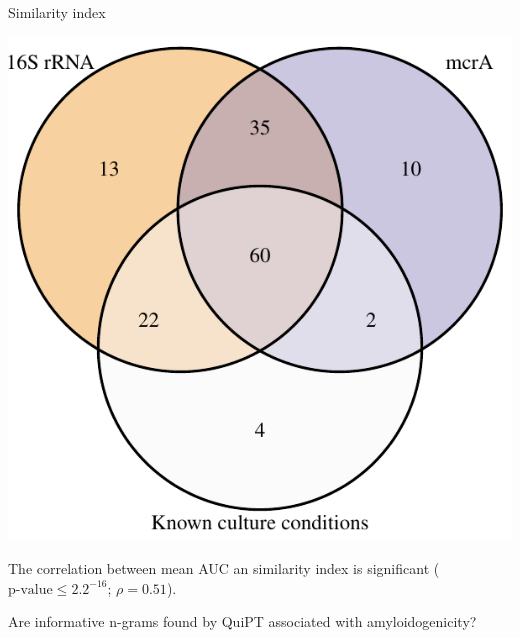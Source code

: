 \documentclass{beamer}\usepackage[]{graphicx}\usepackage[]{color}
\makeatletter
\def\maxwidth{ %
  \ifdim\Gin@nat@width>\linewidth
    \linewidth
  \else
    \Gin@nat@width
  \fi
}
\newenvironment{knitrout}{}{} %
\makeatother
\begin{document}
\begin{frame}{Similarity index}
\begin{knitrout}
\color{fgcolor}

{\centering \includegraphics[width=\maxwidth]{figure/unnamed-chunk-17-1} 

}



\end{knitrout}
The correlation between mean AUC an similarity index is significant ($\textrm{p-value} \leq 2.2^{-16}$; $\rho = 0.51$).
\end{frame}
   
\begin{frame}{}
Are informative n-grams found by QuiPT associated with amyloidogenicity?
\end{frame}
\end{document}
